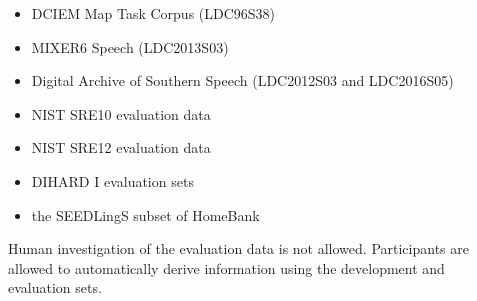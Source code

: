 \begin{itemize}
	\item DCIEM Map Task Corpus (LDC96S38)
	\item MIXER6 Speech (LDC2013S03)
	\item Digital Archive of Southern Speech (LDC2012S03 and LDC2016S05)
	\item NIST SRE10 evaluation data
	\item NIST SRE12 evaluation data
	\item DIHARD I evaluation sets
	\item the SEEDLingS subset of HomeBank
\end{itemize}

Human investigation of the evaluation data is not allowed. Participants are allowed to automatically derive information using the development and evaluation sets.
